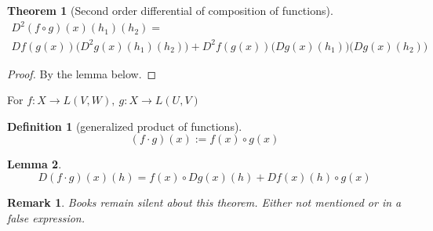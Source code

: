 \documentclass{report}
\newtheorem{theo}{Theorem}[section]
\newtheorem{lem}[theo]{Lemma}
\newtheorem{defi}{Definition}[section]
\newtheorem*{remark}{Remark}
\begin{document}
\begin{theo}[Second order differential of composition of functions]

\begin{multline*}
    D^2(f \circ g)(x)(h_1)(h_2) = \\ Df(g(x))\big(D^2g(x)(h_1)(h_2)\big) + D^2f(g(x))\big(Dg(x)(h_1)\big)\big(Dg(x)(h_2)\big)
\end{multline*}

\end{theo}
\begin{proof}
By the lemma below.
\end{proof}

\medskip
For $f: X \to L(V,W), \ g: X \to L(U, V)$
\begin{defi}[generalized product of functions]
\[
(f \cdot g) (x) := f(x) \circ g(x) 
\]
\end{defi}

\begin{lem}
\[
D(f\cdot g)(x)(h) = f(x) \circ Dg(x)(h) + Df(x)(h) \circ g(x) 
\]
\end{lem}

\begin{remark}
Books remain silent about this theorem. Either not mentioned or in a false expression.
\end{remark}

%
\end{document}
